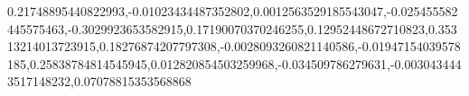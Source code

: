 0.21748895440822993,-0.01023434487352802,0.0012563529185543047,-0.025455582445575463,-0.3029923653582915,0.17190070370246255,0.12952448672710823,0.35313214013723915,0.18276874207797308,-0.0028093260821140586,-0.01947154039578185,0.25838784814545945,0.012820854503259968,-0.034509786279631,-0.0030434443517148232,0.07078815353568868